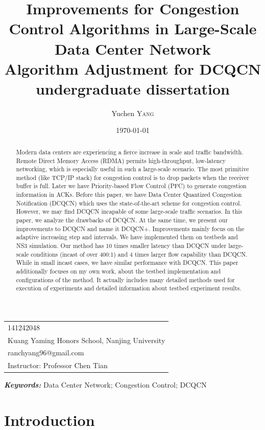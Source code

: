 \documentclass[12pt,a4paper]{article}
\title{Improvements for Congestion Control Algorithms in Large-Scale Data Center Network \\ Algorithm Adjustment for DCQCN \\ undergraduate dissertation} %
\author{Yuchen \textsc{Yang}} %
\date{\today} %
\providecommand{\keywords}[1]{\textbf{\textit{Keywords:}} #1}
\begin{document}
\maketitle %

\begin{center}
\begin{tabular}{l}
141242048 \\
Kuang Yaming Honors School, Nanjing University \\
ranchyang96@gmail.com \\
Instructor: Professor Chen Tian
\end{tabular}
\end{center}


\begin{abstract}
	Modern data centers are experiencing a fierce increase in scale and traffic bandwidth.
	Remote Direct Memory Access (RDMA) permits high-throughput, low-latency networking,
	which is especially useful in such a large-scale scenario.
	The most primitive method (like TCP/IP stack) for congestion control is to drop packets when the receiver buffer is full.
	Later we have Priority-based Flow Control (PFC) to generate congestion information in ACKs.
	Before this paper, we have Data Center Quantized Congestion Notification (DCQCN) which uses the state-of-the-art scheme for congestion control.
	However, we may find DCQCN incapable of some large-scale traffic scenarios.
	In this paper, we analyze the drawbacks of DCQCN.
	At the same time, we present our improvements to DCQCN and name it DCQCN+.
	Improvements mainly focus on the adaptive increasing step and intervals.
	We have implemented them on testbeds and NS3 simulation.
	Our method has 10 times smaller latency than DCQCN under large-scale conditions (incast of over 400:1) and 4 times larger flow capability than DCQCN.
	While in small incast cases, we have similar performance with DCQCN.
	This paper additionally focuses on my own work, about the testbed implementation and configurations of the method.
	It actually includes many detailed methods used for execution of experiments and detailed information about testbed experiment results.
\end{abstract}

\keywords{Data Center Network; Congestion Control; DCQCN}

\tableofcontents
\listoffigures
\listoftables

\newpage
\section{Introduction}
\end{document}
